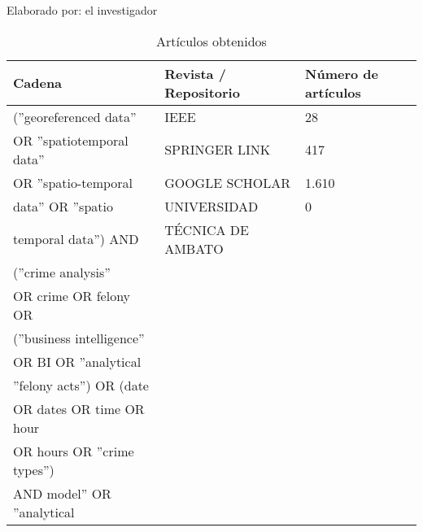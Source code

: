 \begin{ThreePartTable}
    \begin{TableNotes}[flushleft]
        \centering
        \item Elaborado por: el investigador
    \end{TableNotes}
    \begin{longtable}{|l|l|l|}
        \caption{Artículos obtenidos}
        \label{table:articulosobtenidos}                                                                  \\
        \hline
        \textbf{Cadena}                   & \textbf{Revista / Repositorio} & \textbf{Número de artículos} \\
        \hline
        (''georeferenced data''           & IEEE                           & 28                           \\
        OR ''spatiotemporal data''        & SPRINGER LINK                  & 417                          \\
        OR ''spatio-temporal              & GOOGLE SCHOLAR                 & 1.610                        \\
        data'' OR ''spatio                & UNIVERSIDAD                    & 0                            \\
        temporal data'') AND              & TÉCNICA DE AMBATO              &                              \\
        (''crime analysis''               &                                &                              \\
        OR crime OR felony OR             &                                &                              \\
        (''business intelligence''        &                                &                              \\
        OR BI OR ''analytical             &                                &                              \\
        ''felony acts'') OR (date         &                                &                              \\
        OR dates OR time OR  hour         &                                &                              \\
        OR hours OR ''crime types'')      &                                &                              \\
        AND  model'' OR ''analytical      &                                &                              \\

\end{longtable}
\end{ThreePartTable}
